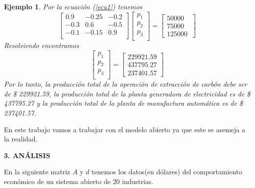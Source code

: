 \documentclass[10pt,a4paper]{article}
\newtheorem{ejemplo}{Ejemplo}[section]
\begin{document}
\begin{multicols}{2}
\begin{ejemplo}
		Por la ecuación (\ref{ecu1}) tenemos
		\begin{equation*}
			\begin{bmatrix}
				0.9&-0.25&-0.2\\
				-0.3&0.6&-0.5\\
				-0.1&-0.15&0.9\\
			\end{bmatrix}
			\begin{bmatrix}
			p_1\\
			p_2\\
			p_3\\
			\end{bmatrix}
			=
			\begin{bmatrix}
			50000 \\
			75000  \\
			125000\
			\end{bmatrix}
		\end{equation*}
		Resolviendo encontramos 
		\begin{equation*}
			\begin{bmatrix}
			p_1\\
			p_2\\
			p_3\\
			\end{bmatrix}
			=
			\begin{bmatrix}
			229921.59\\
			437795.27\\
			237401.57
			\end{bmatrix}
		\end{equation*}
		Por lo tanto, la producción total de la operación de extracción de carbón debe ser de \$ 229921.59, la producción total de la planta generadora de electricidad es de \$ 437795.27 y la producción total de la planta de manufactura automática es de \$ 237401.57.
\end{ejemplo}
En este trabajo vamos a trabajar con el modelo abierto ya que este se asemeja a la realidad.
\vspace*{0.5cm}
\begin{center}
{\large \bf 3. AN\'ALISIS}
\end{center}
 En la siguiente matriz $A$ y $d$ tenemos los datos(en dólares) del comportamiento económico de un sistema abierto de 20 industrias.

\end{multicols}
\end{document}
